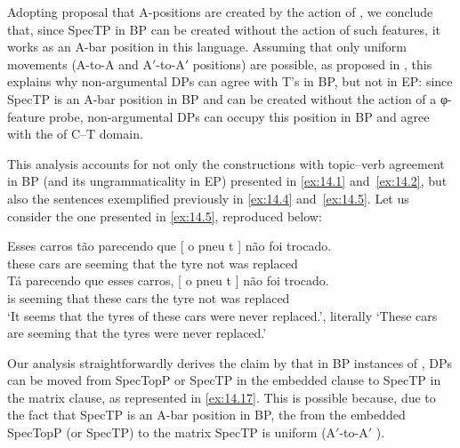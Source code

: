 \documentclass[output=paper]{langsci/langscibook}
\begin{document}
Adopting  proposal that A-positions are created by the
action of , we conclude that, since SpecTP in \gls{BP} can be
created without the action of such features, it works as an A-bar position in
this language. Assuming that only uniform movements (A-to-A and A$'$-to-A$'$
positions) are possible, as proposed in \citet{Chomsky2008}, this explains why
non-argumental DPs can agree with T’s  in BP, but not in EP: since
SpecTP is an A-bar position in \gls{BP} and can be created without the action
of a φ-feature probe, non-argumental DPs can occupy this position in \gls{BP}
and agree with the  of C--T domain.

This analysis accounts for not only the constructions with topic--verb
agreement in \gls{BP} (and its ungrammaticality in EP) presented in
\eqref{ex:14.1} and~\eqref{ex:14.2}, but also the 
sentences exemplified previously in \eqref{ex:14.4}
and~\eqref{ex:14.5}. Let us consider the one presented in
\eqref{ex:14.5}, reproduced below:

\ea\label{ex:14.16}
    \ea
	\gll    Esses carros tão parecendo que [ o pneu t ] não foi trocado.\\
    these cars are seeming that {} the tyre {} {} not was replaced\\
    \ex
    \gll    Tá parecendo que esses carros, [ o pneu t ] não foi trocado.\\
    is seeming that these cars {} the tyre {} {} not was replaced\\
    \glt    ‘It seems that the tyres of these cars were never replaced.’,
            literally ‘These cars are seeming that the tyres were never replaced.’
    \z
\z

\begin{sloppypar}
Our analysis straightforwardly derives the claim by \citet{NunesMartins2010}
that in \gls{BP} instances of , DPs can be moved from SpecTopP
or SpecTP in the embedded clause to SpecTP in the matrix clause, as
represented in \eqref{ex:14.17}. This is possible because, due to the fact that
SpecTP is an A-bar position in BP, the  from the embedded SpecTopP
(or SpecTP) to the matrix SpecTP is uniform (A$'$-to-A$'$ ).
\end{sloppypar}
\end{document}
